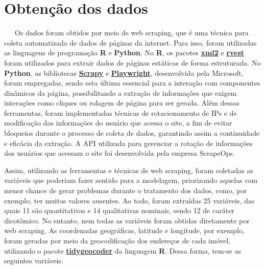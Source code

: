 \documentclass[
  12pt,
  a4paper,
]{scrreprt}
\begin{document}
\section{Obtenção dos dados}\label{obtenuxe7uxe3o-dos-dados}

~~~Os dados foram obtidos por meio de web scraping, que é uma técnica
para coleta automatizada de dados de páginas da internet. Para isso,
foram utilizadas as linguagens de programação \textbf{R} e
\textbf{Python}. No \textbf{R}, os pacotes
\href{https://xml2.r-lib.org/}{\textbf{xml2}} e
\href{https://rvest.tidyverse.org/}{\textbf{rvest}} foram utilizados
para extrair dados de páginas estáticas de forma estruturada. No
\textbf{Python}, as bibliotecas
\href{https://scrapy.org/}{\textbf{Scrapy}} e
\href{https://playwright.dev/python/}{\textbf{Playwright}}, desenvolvida
pela Microsoft, foram empregadas, sendo esta última essencial para a
interação com componentes dinâmicos da página, possibilitando a extração
de informações que exigem interações como cliques ou rolagem de página
para ser gerada. Além dessas ferramentas, foram implementadas técnicas
de rotacionamento de IPs e de modificação das informações do usuário que
acessa o site, a fim de evitar bloqueios durante o processo de coleta de
dados, garantindo assim a continuidade e eficácia da extração. A API
utilizada para gerenciar a rotação de informações dos usuários que
acessam o site foi desenvolvida pela empresa ScrapeOps.

\vspace{12pt}

Assim, utilizando as ferramentas e técnicas de web scraping, foram
coletadas as variáveis que poderiam fazer sentido para a modelagem,
priorizando aquelas com menor chance de gerar problemas durante o
tratamento dos dados, como, por exemplo, ter muitos valores ausentes. Ao
todo, foram extraídas 25 variáveis, das quais 11 são quantitativas e 14
qualitativas nominais, sendo 12 de caráter dicotômico. No entanto, nem
todas as variáveis foram obtidas diretamente por web scraping. As
coordenadas geográficas, latitude e longitude, por exemplo, foram
geradas por meio da geocodificação dos endereços de cada imóvel,
utilizando o pacote
\href{https://jessecambon.github.io/tidygeocoder/}{\textbf{tidygeocoder}}
da linguagem \textbf{R}. Dessa forma, tem-se as seguintes variáveis:
\end{document}
